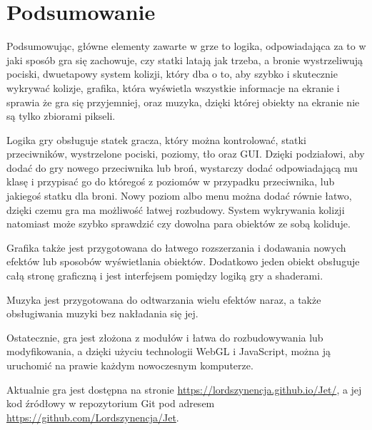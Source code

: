 \chapter{Podsumowanie}
\thispagestyle{chapterBeginStyle}
\label{ch:outro}

Podsumowując, główne elementy zawarte w grze to logika, odpowiadająca za to w jaki sposób gra się zachowuje, czy statki latają jak trzeba, a bronie wystrzeliwują pociski, dwuetapowy system kolizji, który dba o to, aby szybko i skutecznie wykrywać kolizje, grafika, która wy\'swietla wszystkie informacje na ekranie i sprawia że gra się przyjemniej, oraz muzyka, dzięki której obiekty na ekranie nie są tylko zbiorami pikseli.\bigskip

Logika gry obsługuje statek gracza, który można kontrolować, statki przeciwników, wystrzelone pociski, poziomy, tło oraz GUI. Dzięki podziałowi, aby dodać do gry nowego przeciwnika lub broń, wystarczy dodać odpowiadającą mu klasę i przypisać go do którego\'s z poziomów w przypadku przeciwnika, lub jakiego\'s statku dla broni. Nowy poziom albo menu można dodać równie łatwo, dzięki czemu gra ma możliwo\'sć łatwej rozbudowy. System wykrywania kolizji natomiast może szybko sprawdzić czy dowolna para obiektów ze sobą koliduje.\bigskip

Grafika także jest przygotowana do łatwego rozszerzania i dodawania nowych efektów lub sposobów wy\'swietlania obiektów. Dodatkowo jeden obiekt obsługuje całą stronę graficzną i jest interfejsem pomiędzy logiką gry a shaderami.\bigskip

Muzyka jest przygotowana do odtwarzania wielu efektów naraz, a także obsługiwania muzyki bez nakładania się jej.\bigskip

Ostatecznie, gra jest złożona z modułów i łatwa do rozbudowywania lub modyfikowania, a dzięki użyciu technologii WebGL i JavaScript, można ją uruchomić na prawie każdym nowoczesnym komputerze.\bigskip

Aktualnie gra jest dostępna na stronie \url{https://lordszynencja.github.io/Jet/}, a jej kod źródłowy w repozytorium Git pod adresem \url{https://github.com/Lordszynencja/Jet}.
\cleardoublepage